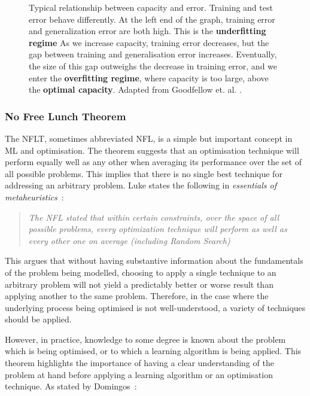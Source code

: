 \begin{figure}[htp]
    \centering
    
    \captionsetup{format=hang} %
    \caption{
        Typical relationship between capacity and error. Training and test error
        behave differently. At the left end of the graph, training error and
        generalization error are both high. This is the \textbf{underfitting
        regime} As we increase capacity, training error decreases, but the gap
        between training and generalisation error increases. Eventually, the
        size of this gap outweighs the decrease in training error, and we enter
        the \textbf{overfitting regime}, where capacity is too large, above the
        \textbf{optimal capacity}. Adapted from Goodfellow et. al.
        \cite{Goodfellow-et-al-2016}.
    }
    \label{fig:capacity}
\end{figure}

\subsubsection{No Free Lunch Theorem}

The \gls{NFLT}, sometimes abbreviated NFL, is a simple but important concept in
\gls{ML} and optimisation. The theorem suggests that an optimisation technique
will perform equally well as any other when averaging its performance over the
set of all possible problems. This implies that there is no single best
technique for addressing an arbitrary problem. Luke states the following in
\textit{essentials of metaheuristics}~\cite{luke2012essentials}:

\begin{quotation}
    \textit{The NFL stated that within certain constraints, over the space of
    all possible problems, every optimization technique will perform as well as
    every other one on average (including Random Search)}
\end{quotation}

This argues that without having substantive information about the fundamentals
of the problem being modelled, choosing to apply a single technique to an
arbitrary problem will not yield a predictably better or worse result than
applying another to the same problem. Therefore, in the case where the
underlying process being optimised is not well-understood, a variety of
techniques should be applied.

However, in practice, knowledge to some degree is known about the problem which
is being optimised, or to which a learning algorithm is being applied. This
theorem highlights the importance of having a clear understanding of the problem
at hand before applying a learning algorithm or an optimisation technique. As
stated by Domingos~\cite{Domingos15}:

